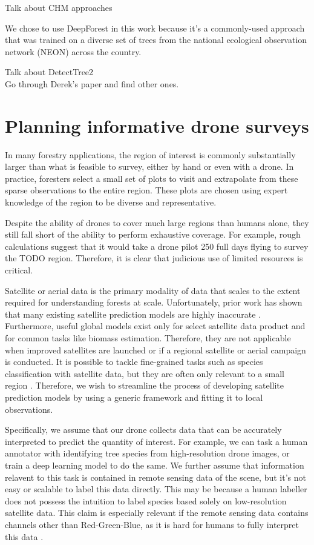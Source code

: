 Talk about CHM approaches

We chose to use DeepForest \cite{Weinstein2020DeepForest:Delineation} in this work because it's a commonly-used approach that was trained on a diverse set of trees from the national ecological observation network (NEON) \cite{Keller2008ANetwork} across the country.

Talk about DetectTree2 \cite{DetectTree2} \\
Go through Derek's paper and find other ones.

\section{Planning informative drone surveys}

In many forestry applications, the region of interest is commonly substantially larger than what is feasible to survey, either by hand or even with a drone. In practice, foresters  select a small set of plots to visit and extrapolate from these sparse observations to the entire region. These plots are chosen using expert knowledge of the region to be diverse and representative.

Despite the ability of drones to cover much large regions than humans alone, they still fall short of the ability to perform  exhaustive coverage. For example, rough calculations suggest that it would take a drone pilot 250 full days flying to survey the TODO region. Therefore, it is clear that judicious use of limited resources is critical.

Satellite or aerial data is the primary modality of data that scales to the extent required for understanding forests at scale. Unfortunately, prior work has shown that many existing satellite prediction models are highly inaccurate \cite{}. Furthermore, useful global models exist only for select satellite data product and for common tasks like biomass estimation. Therefore, they are not applicable when improved satellites are launched or if a regional satellite or aerial campaign is conducted.
It is possible to tackle fine-grained tasks such as species classification with satellite data, but they are often only relevant to a small region \cite{Sweden}. 
Therefore, we wish to streamline the process of developing satellite prediction models by using a generic framework and fitting it to local observations.

Specifically, we assume that our drone collects data that can be accurately interpreted to predict the quantity of interest. For example, we can task a human annotator with identifying tree species from high-resolution drone images, or train a deep learning model to do the same. We further assume that information relavent to this task is contained in remote sensing data of the scene, but it's not easy or scalable to label this data directly. This may be because a human labeller does not possess the intuition to label species based solely on low-resolution satellite data. This claim is especially relevant if the remote sensing data contains channels other than Red-Green-Blue, as it is hard for humans to fully interpret this data \cite{Hard to label multispectral}.

